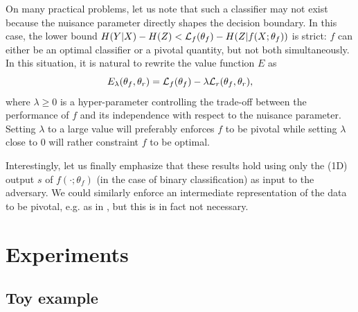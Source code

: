 \documentclass[twocolumn,superscriptaddress,aps]{revtex4-1}
\theoremstyle{plain}
\begin{document}
On many practical problems, let us note that such a classifier may
not exist because the nuisance parameter directly shapes the decision boundary.
In this case, the lower bound $ H({Y|X}) - H(Z) < {\cal L}_f(\theta_f) - H({Z|f(X;\theta_f)})$ is strict: $f$ can either be an optimal classifier or a
pivotal quantity, but not both simultaneously. In this situation, it is natural
to rewrite the value function $E$  as
\begin{equation}\label{eqn:vf-lambda}
    E_\lambda(\theta_f, \theta_r) = {\cal L}_f(\theta_f) - \lambda {\cal L}_r(\theta_f, \theta_r),
\end{equation}
where $\lambda \geq 0$ is a hyper-parameter controlling the trade-off between
the performance of $f$ and its independence with respect to the nuisance
parameter. Setting $\lambda$ to a large value will preferably enforces $f$ to
be pivotal while setting $\lambda$ close to $0$ will rather constraint $f$ to be
optimal.

Interestingly, let us finally emphasize that these results hold using only the (1D) output $s$
of $f(\cdot;\theta_f)$ (in the case of binary classification) as input to the adversary. We
could similarly enforce an intermediate representation of the data to be
pivotal, e.g. as in \citep{ganin2014unsupervised}, but this is in fact not
necessary.



\section{Experiments}

\subsection{Toy example}
\label{sec:toy}
\end{document}
